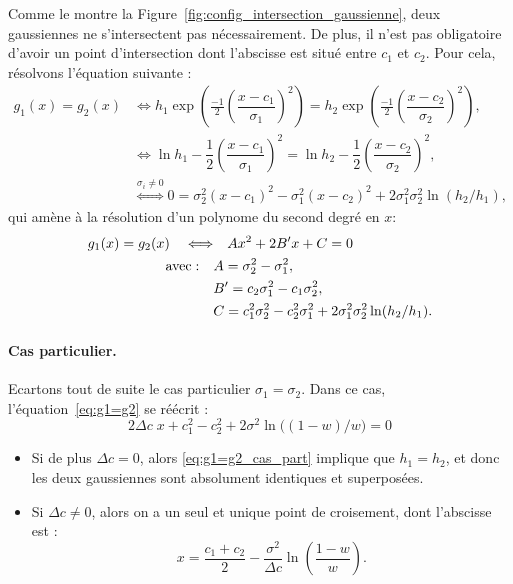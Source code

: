 \documentclass[main.tex]{subfiles}
\begin{document}
Comme le montre la Figure~\ref{fig:config_intersection_gaussienne}, deux gaussiennes ne s'intersectent pas nécessairement. De plus, il n'est pas obligatoire d'avoir un point d'intersection dont l'abscisse est situé entre $c_1$ et $c_2$. Pour cela, résolvons l'équation suivante :
\begin{align*}
g_1(x)=g_2(x) 
& \Leftrightarrow h_1\exp \left(\frac{-1}{2} \left( \dfrac{x-c_1}{\sigma_1}\right)^2  \right) = h_2\exp \left(\frac{-1}{2} \left( \dfrac{x-c_2}{\sigma_2}\right)^2  \right), \\
& \Leftrightarrow \ln h_1 - \dfrac{1}{2}\left( \dfrac{x-c_1}{\sigma_1} \right)^2 = \ln h_2 - \dfrac{1}{2}\left( \dfrac{x-c_2}{\sigma_2} \right)^2, \\
& \overset{\sigma_i \neq 0}{\Leftrightarrow} 0 = \sigma_2^2 (x-c_1)^2 - \sigma_1^2 (x-c_2)^2 + 2\sigma_1^2\sigma_2^2 \ln( h_2 / h_1 ),
\end{align*}
qui amène à la résolution d'un polynome du second degré en $x$:
\begin{equation}
\begin{aligned}
\label{eq:g1=g2}
g_1(x)=g_2(x) \quad \Longleftrightarrow & \quad  Ax^2 + 2B'x + C =0 \\
{\rm avec :} \quad &A=\sigma_2^2 - \sigma_1^2, \\
& B'=c_2\sigma_1^2-c_1\sigma_2^2,\\
& C= c_1^2\sigma_2^2-c_2^2\sigma_1^2 +  2\sigma_1^2\sigma_2^2 \ln( h_2 / h_1 ).
\end{aligned}
\end{equation}
\paragraph{Cas particulier.}
Ecartons tout de suite le cas particulier $\sigma_1=\sigma_2$. %
Dans ce cas, l'équation~\eqref{eq:g1=g2} se réécrit :
\begin{equation}
\label{eq:g1=g2_cas_part}
2\Delta c \; x + c_1^2-c_2^2 +  2 \sigma^2 \ln \big( (1-w) / w \big) = 0
\end{equation}
\begin{itemize}
\item Si de plus $\Delta c=0$, alors \eqref{eq:g1=g2_cas_part} implique que $h_1=h_2$, et donc les deux gaussiennes sont absolument identiques et superposées.
\item Si $\Delta c\neq0$, alors on a un seul et unique point de croisement, dont l'abscisse est :
\begin{equation}
\label{eq:pt_croisement_unique}
x=\dfrac{c_1+c_2}{2}-\dfrac{\sigma^2}{\Delta c}\ln \left( \dfrac{1-w}{w} \right).
\end{equation}
\end{itemize}
\end{document}
